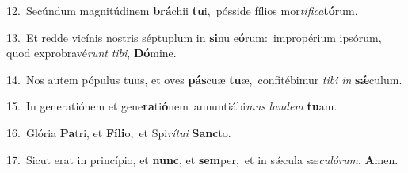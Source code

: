 {\numbfont\textcolor{\numbcolor}{12.}}~Secúndum magnitúdinem \textbf{brá}\-chii \textbf{tu}\-i,~\star pósside fílios mor\-\textit{ti}\-\textit{fi}\textit{ca}\textbf{tó}rum.\par
{\numbfont\textcolor{\numbcolor}{13.}}~Et redde vicínis nostris séptuplum in \textbf{si}\-nu e\-\textbf{ó}\-rum:~\star impropérium ipsórum, quod exprobravé\textit{runt} \textit{ti}\-\textit{bi}, \textbf{Dó}\-mine.\par
{\numbfont\textcolor{\numbcolor}{14.}}~Nos autem pópulus tuus, et oves \textbf{pás}\-cuæ \textbf{tu}\-æ,~\star confitébimur \textit{ti}\-\textit{bi} \textit{in} \textbf{sǽ}\-culum.\par
{\numbfont\textcolor{\numbcolor}{15.}}~In generatiónem et gene\-\textbf{ra}\-ti\-\textbf{ó}\-nem~\star annuntiábi\textit{mus} \textit{lau}\-\textit{dem} \textbf{tu}\-am.\par
{\numbfont\textcolor{\numbcolor}{16.}}~Glória \textbf{Pa}\-tri, et \textbf{Fí}\-\textbf{li}o,~\star et Spi\-\textit{rí}\-\textit{tu}\textit{i} \textbf{Sanc}\-to.\par
{\numbfont\textcolor{\numbcolor}{17.}}~Sicut erat in princípio, et \textbf{nunc}\-, et \textbf{sem}\-per,~\star et in sǽcula sæ\-\textit{cu}\-\textit{ló}\textit{rum}. \textbf{A}\-men.\par
